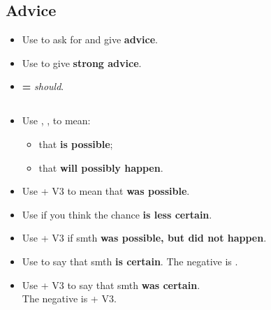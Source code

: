 \subsection{Advice}
\begin{itemize}
    \item Use  to ask for and give \textbf{advice}.
    \item[\doot] Use  to give \textbf{strong advice}.
    \item {} \textbf{=} \textit{should}.
\end{itemize}

\subsection{}
\begin{itemize}
    \item Use , ,  to mean:
    \begin{itemize}
        \item that \textbf{is possible};
        \item[\daash] that \textbf{will possibly happen}.
    \end{itemize}
    \item[\doot] Use  + V3 to mean that \textbf{was possible}.
    \item Use  if you think the chance \textbf{is less certain}.
    \item[\doot] Use  + V3 if smth \textbf{was possible, but did not happen}.
    \item[\doot] Use  to say that smth \textbf{is certain}. The negative is .
    \item[\doot] Use  + V3 to say that smth \textbf{was certain}.\\
    The negative is  + V3.
\end{itemize}

